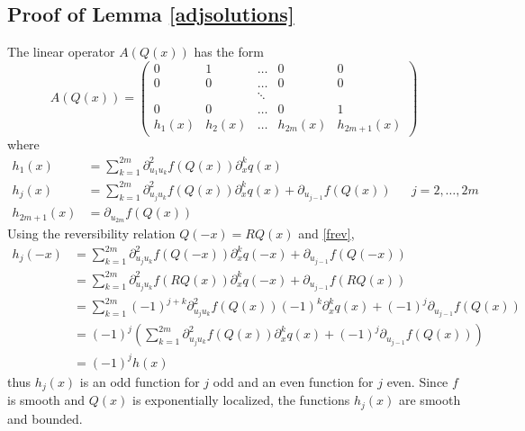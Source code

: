 \documentclass[thesis.tex]{subfiles}
\begin{document}
\subsection{Proof of Lemma \ref{adjsolutions}}

The linear operator $A(Q(x))$ has the form 
\begin{equation}\label{DefAQ}
A(Q(x)) = \begin{pmatrix}
0 & 1 & \dots & 0 & 0 \\
0 & 0 & \dots & 0 & 0 \\
& & \ddots  \\
0 & 0 & \dots & 0 & 1 \\
h_1(x) & h_2(x) & \dots & h_{2m}(x) & h_{2m+1}(x)
\end{pmatrix}
\end{equation} 
where
\begin{equation*}
\begin{aligned}
h_1(x) &= \sum_{k=1}^{2m}\partial^2_{u_1 u_k} f(Q(x))\partial_x^k q(x) \\
h_j(x) &= \sum_{k=1}^{2m}\partial^2_{u_j u_k} f(Q(x))\partial_x^k q(x) + \partial_{u_{j-1}}f(Q(x)) && j = 2, \dots, 2m \\
h_{2m+1}(x) &= \partial_{u_{2m}}f(Q(x))
\end{aligned}
\end{equation*}
Using the reversibility relation $Q(-x) = R Q(x)$ and \eqref{frev},
\begin{align*}
h_j(-x) &= \sum_{k=1}^{2m}\partial^2_{u_j u_k} f(Q(-x))\partial_x^k q(-x) + \partial_{u_{j-1}}f(Q(-x)) \\
&= \sum_{k=1}^{2m}\partial^2_{u_j u_k} f(RQ(x))\partial_x^k q(-x) + \partial_{u_{j-1}}f(RQ(x)) \\
&= \sum_{k=1}^{2m} (-1)^{j+k} \partial^2_{u_j u_k} f(Q(x)) (-1)^k \partial_x^k q(x) + (-1)^j \partial_{u_{j-1}}f(Q(x)) \\
&= (-1)^j \left( \sum_{k=1}^{2m} \partial^2_{u_j u_k} f(Q(x)) \partial_x^k q(x) + (-1)^j \partial_{u_{j-1}}f(Q(x)) \right) \\
&= (-1)^j h(x)
\end{align*} 
thus $h_j(x)$ is an odd function for $j$ odd and an even function for $j$ even. Since $f$ is smooth and $Q(x)$ is exponentially localized, the functions $h_j(x)$ are smooth and bounded.
\end{document}
